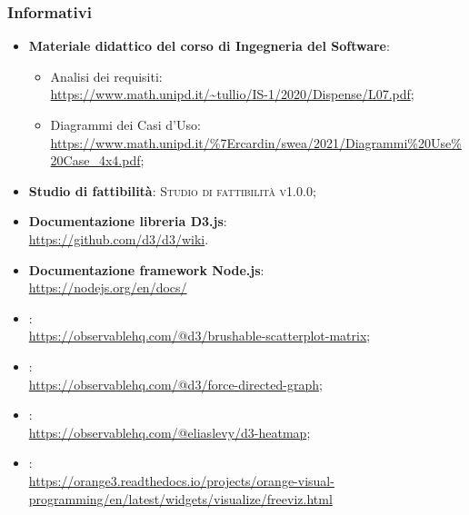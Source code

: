 \documentclass[../analisi-dei-requisiti.tex]{subfiles}
\begin{document}
\subsubsection{Informativi}%
\label{ssub:informativi}
\begin{itemize}
  \item \textbf{Materiale didattico del corso di Ingegneria del Software}:
  \begin{itemize}
    \item Analisi dei requisiti: \\
    \url{https://www.math.unipd.it/~tullio/IS-1/2020/Dispense/L07.pdf};
    \item Diagrammi dei Casi d'Uso: \\
    \url{https://www.math.unipd.it/%7Ercardin/swea/2021/Diagrammi%20Use%20Case_4x4.pdf};
  \end{itemize}
  \item \textbf{Studio di fattibilità}: \textsc{Studio di fattibilità v1.0.0};
  
  \item \textbf{Documentazione libreria D3.js}: \\
  \url{https://github.com/d3/d3/wiki}.

  \item \textbf{Documentazione framework Node.js}: \\
  \url{https://nodejs.org/en/docs/}

  \item {}: \\ 
  \url{https://observablehq.com/@d3/brushable-scatterplot-matrix};
        
  \item {}: \\  
  \url{https://observablehq.com/@d3/force-directed-graph};

  \item {}: \\ 
  \url{https://observablehq.com/@eliaslevy/d3-heatmap}; 
        
  \item {}: \\ 
  \url{https://orange3.readthedocs.io/projects/orange-visual-programming/en/latest/widgets/visualize/freeviz.html}
\end{itemize}
\end{document}

